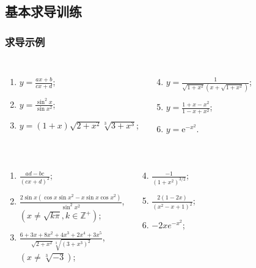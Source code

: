 \documentclass[
10pt,
aspectratio=43,
]{beamer}
\begin{document}
\subsection{基本求导训练}\begin{frame}
	\frametitle{求导示例}
	\everymath{\displaystyle}
	\begin{block}{}
		\begin{columns}[onlytextwidth]
			\begin{enumerate}
				\item $y=\frac{a x+b}{c x+d}$;
				\item $y=\frac{\sin ^2 x}{\sin x^2}$;
				\item $y=(1+x) \sqrt{2+x^2} \sqrt[3]{3+x^3}$;
			\end{enumerate}
			\begin{enumerate}
				\setcounter{enumi}{3}
				\item $y=\frac{1}{\sqrt{1+x^2}\left(x+\sqrt{1+x^2}\right)}$;
				\item $y=\frac{1+x-x^2}{1-x+x^2}$;
				\item $y=\mathrm{e}^{-x^2}$.
			\end{enumerate}
		\end{columns}
	\end{block}

	\begin{exampleblock}{}
		\begin{columns}[onlytextwidth]
			\begin{enumerate}
				\pause
				\item $\displaystyle \frac{a d-b c}{(c x+d)^2}$;
				\item $\frac{2 \sin x\left(\cos x \sin x^2-x \sin x \cos x^2\right)}{\sin ^2 x^2}$,\\$(x \neq \sqrt{k\pi}, k\in\mathbb{Z}^+)$;
				\item $\frac{6+3 x+8 x^2+4 x^3+2 x^4+3 x^5}{\sqrt{2+x^2} \sqrt[3]{\left(3+x^3\right)^2}}$,\\$(x \neq \sqrt[3]{-3})$;
			\end{enumerate}
			\begin{enumerate}
				\setcounter{enumi}{3}
				\pause
				\item $\displaystyle \frac{-1}{(1+x^2)^{3/2}}$;
				\item $\displaystyle \frac{2(1-2x)}{(x^2-x+1)^2}$;
				\item $\displaystyle -2 x e^{-x^2}$;
			\end{enumerate}
		\end{columns}
	\end{exampleblock}
\end{frame}
\end{document}
